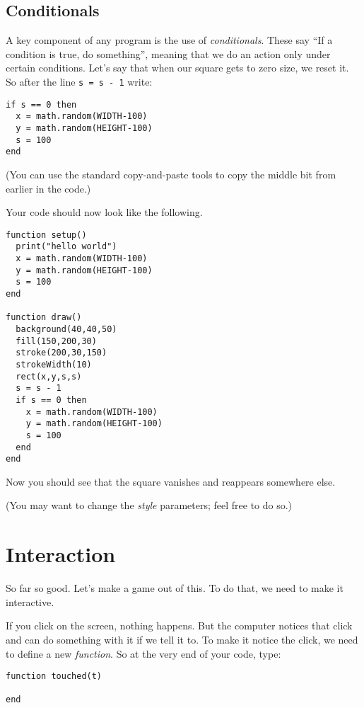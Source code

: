 \documentclass[
  xhtml,%
  use filename%
]{internet}
\begin{document}
\subsection{Conditionals}

A key component of any program is the use of \emph{conditionals}.
These say ``If a condition is true, do something'', meaning that we do an action only under certain conditions.
Let's say that when our square gets to zero size, we reset it.
So after the line \verb+s = s - 1+ write:

\begin{verbatim}
if s == 0 then
  x = math.random(WIDTH-100)
  y = math.random(HEIGHT-100)
  s = 100
end
\end{verbatim}

(You can use the standard copy-and-paste tools to copy the middle bit from earlier in the code.)

Your code should now look like the following.

\begin{verbatim}
function setup()
  print("hello world")
  x = math.random(WIDTH-100)
  y = math.random(HEIGHT-100)
  s = 100
end

function draw()
  background(40,40,50)
  fill(150,200,30)
  stroke(200,30,150)
  strokeWidth(10)
  rect(x,y,s,s)
  s = s - 1
  if s == 0 then
    x = math.random(WIDTH-100)
    y = math.random(HEIGHT-100)
    s = 100
  end
end
\end{verbatim}


Now you should see that the square vanishes and reappears somewhere else.

(You may want to change the \emph{style} parameters; feel free to do so.)

\section{Interaction}

So far so good.
Let's make a game out of this.
To do that, we need to make it interactive.

If you click on the screen, nothing happens.
But the computer notices that click and can do something with it if we tell it to.
To make it notice the click, we need to define a new \emph{function}.
So at the very end of your code, type:

\begin{verbatim}
function touched(t)

end
\end{verbatim}
\end{document}
